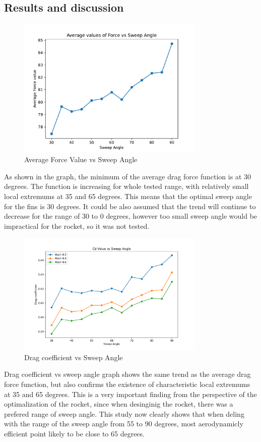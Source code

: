 \documentclass{article}
\begin{document}
\subsection{Results and discussion}
\begin{figure}[H]
    \centering
    \includegraphics[width=0.8\textwidth]{../data/R6-Parametric-Fins/ForceVsSweepAngle.pdf}
    \caption{Average Force Value vs Sweep Angle}
\end{figure}
As shown in the graph, the minimum of the average drag force function is at 30 degrees. The function
is increasing for whole tested range, with relatively small local extremums at 35 and 65 degrees. This
means that the optimal sweep angle for the fins is 30 degrees. It could be also assumed that the
trend will continue to decrease for the range of 30 to 0 degrees, however too small sweep angle
would be impractical for the rocket, so it was not tested.
\begin{figure}[H]
    \centering
    \includegraphics[width=0.8\textwidth]{../data/R6-Parametric-Fins/CDvsSweep.pdf}
    \caption{Drag coefficient vs Sweep Angle}
\end{figure}
Drag coefficient vs sweep angle graph shows the same trend as the average drag force function, but 
also confirms the existence of characteristic local extremums at 35 and 65 degrees. This is a very
 important finding from the perspective of the optimalization of the rocket, since when desinginig 
the rocket, there was a prefered range of sweep angle. This study now clearly shows that when 
deling with the range of the sweep angle from 55 to 90 degrees, most aerodynamicly efficient
point likely to be close to 65 degrees.\\\\
\end{document}
